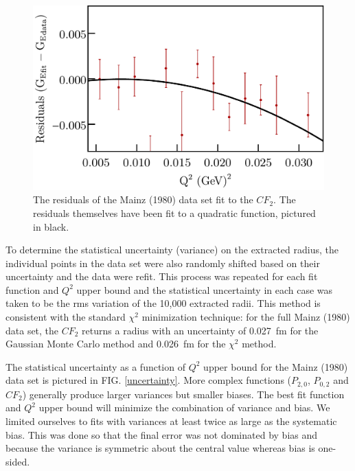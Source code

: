 \documentclass[aps,prd,twocolumn,groupedaddress,10pt]{revtex4-1}
\begin{document}
\begin{figure}[h!]
	\includegraphics[scale=0.41]{residuals_example.pdf}
	\caption{The residuals of the Mainz (1980) data set fit to the ${CF}_2$. The residuals themselves have been fit to a quadratic function, pictured in black.}
	\label{residuals_example}
\end{figure}

To determine the statistical uncertainty (variance) on the extracted radius, the individual points in the data set were also randomly shifted based on their uncertainty and the data were refit. This process was repeated for each fit function and $Q^2$ upper bound and the statistical uncertainty in each case was taken to be the rms variation of the 10,000 extracted radii. This method is consistent with the standard $\chi^2$ minimization technique: for the full Mainz (1980) data set, the ${CF}_2$ returns a radius with an uncertainty of 0.027~fm for the Gaussian Monte Carlo method and 0.026~fm for the $\chi^2$ method. 

The statistical uncertainty as a function of $Q^2$ upper bound for the Mainz (1980) data set is pictured in FIG. \ref{uncertainty}. More complex functions ($P_{2,0}$, $P_{0,2}$ and ${CF}_2$) generally produce larger variances but smaller biases. The best fit function and $Q^2$ upper bound will minimize the combination of variance and bias. We limited ourselves to fits with variances at least twice as large as the systematic bias. This was done so that the final error was not dominated by bias and because the variance is symmetric about the central value whereas bias is one-sided. 
\end{document}
